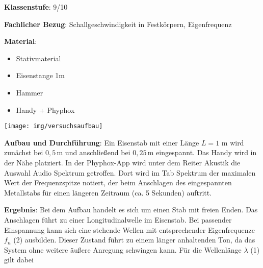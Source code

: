\documentclass[../main.tex]{subfiles}
\begin{document}
\begin{tcolorbox}[
    width=\textwidth,
    height=\textheight,
    title=Phyphox: Schallgeschwindigkeit in Festkörpern,
    fonttitle=\Large,
    before title=\vspace{0.2cm}, after title=\vspace{0.2cm},
    colback=white,
    title filled=true, 
    colbacktitle=myorange,
    colframe=black,
    coltitle=black,
    ]

    \vspace{0.2cm}
    \textbf{Klassenstufe}: 9/10

    \vspace{0.4cm}

    \textbf{Fachlicher Bezug}: Schallgeschwindigkeit in Festkörpern, Eigenfrequenz

    \begin{minipage}[]{0.5\textwidth}
        \vspace{0.4cm} 
        \textbf{Material}:
        \begin{itemize}[noitemsep]
            \item Stativmaterial
            \item Eisenstange 1m
            \item Hammer
            \item Handy + Phyphox
        \end{itemize}

    \end{minipage}
    \hspace{1.4cm}
    \begin{minipage}[]{0.45\textwidth}
        \vspace{0.3cm}
        \texttt{[image: img/versuchsaufbau]}
    \end{minipage}

    \vspace{0.4cm}
    \textbf{Aufbau und Durchführung}: Ein Eisenstab mit einer Länge $L=1$ m wird zunächst bei $0,5\,$m und anschließend bei $0,25\,$m eingespannt. Das Handy wird in der Nähe platziert. In der Phyphox-App wird unter dem Reiter \glqq Akustik\grqq{} die Auswahl \glqq Audio Spektrum\grqq{} getroffen. Dort wird im Tab \glqq Spektrum\grqq{} der maximalen Wert der Frequenzspitze notiert, der beim Anschlagen des eingespannten Metallstabs für einen längeren Zeitraum (ca. 5 Sekunden) auftritt.

    \vspace{0.4cm}
    \textbf{Ergebnis}: Bei dem Aufbau handelt es sich um einen Stab mit freien Enden. Das Anschlagen führt zu einer Longitudinalwelle im Eisenstab. Bei passender Einspannung kann sich eine stehende Wellen mit entsprechender Eigenfrequenze $f_n$ (2) ausbilden. Dieser Zustand führt zu einem länger anhaltenden Ton, da das System ohne weitere äußere Anregung schwingen kann. Für die Wellenlänge $\lambda$ (1) gilt dabei


\end{tcolorbox}
\end{document}
